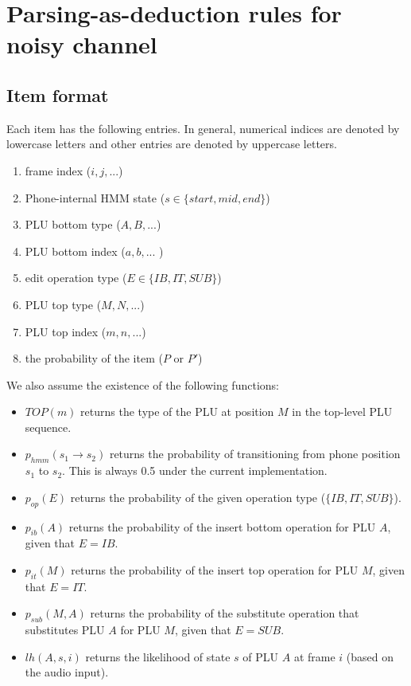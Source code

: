 \documentclass[12pt,letterpaper]{article}
\begin{document}
\section{Parsing-as-deduction rules for noisy channel}
\subsection{Item format}
Each item has the following entries. In general, numerical indices are denoted by lowercase letters and other entries are denoted by uppercase letters. 
\begin{enumerate}
\item frame index ($i, j, ...$)
\item Phone-internal HMM state ($s \in \{start, mid, end\}$)
\item PLU bottom type ($A, B, ...$)
\item PLU bottom index ($a, b, ...$ )
\item edit operation type ($E \in \{IB, IT, SUB\}$)
\item PLU top type ($M, N, ...$)
\item PLU top index ($m, n, ...$)
\item the probability of the item ($P$ or $P'$)
\end{enumerate}

\noindent We also assume the existence of the following functions:
\begin{itemize}
	\item $TOP(m)$ returns the type of the PLU at position $M$ in the top-level PLU sequence.
	\item $p_{hmm}(s_1 \rightarrow s_2)$ returns the probability of transitioning from phone position $s_1$ to $s_2$. This is always 0.5 under the current implementation.
	\item $p_{op}(E)$ returns the probability of the given operation type ($\{IB, IT, SUB\}$).
	\item $p_{ib}(A)$ returns the probability of the insert bottom operation for PLU $A$, given that $E=IB$.
	\item $p_{it}(M)$ returns the probability of the insert top operation for PLU $M$, given that $E=IT$.
	\item $p_{sub}(M,A)$ returns the probability of the substitute operation that substitutes PLU $A$ for PLU $M$, given that $E=SUB$.
	\item $lh(A,s,i)$ returns the likelihood of state $s$ of PLU $A$ at frame $i$ (based on the audio input).
\end{itemize}
\end{document}
